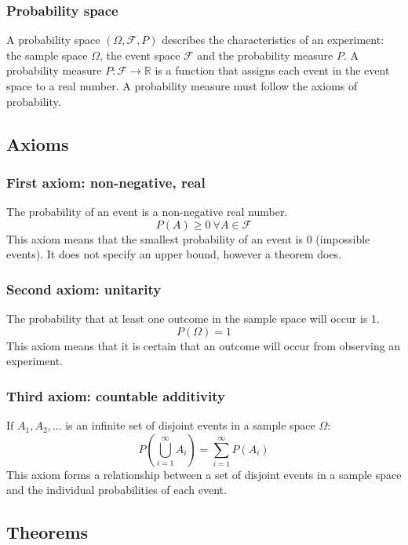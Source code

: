 \documentclass{article}
\begin{document}
\subsubsection{Probability space}

A probability space $(\Omega, \mathcal{F}, P)$ describes the characteristics of an experiment: the sample space $\Omega$, the event space $\mathcal{F}$ and the probability measure $P$. A probability measure $P:\mathcal{F}\rightarrow \mathbb{R}$ is a function that assigns each event in the event space to a real number. A probability measure must follow the axioms of probability.

\subsection{Axioms}

\subsubsection{First axiom: non-negative, real}

The probability of an event is a non-negative real number.
\[P(A) \geq 0 \ \forall A \in \mathcal{F}\]
This axiom means that the smallest probability of an event is 0 (impossible events). It does not specify an upper bound, however a theorem does.

\subsubsection{Second axiom: unitarity}

The probability that at least one outcome in the sample space will occur is 1.
\[P(\Omega)=1\]
This axiom means that it is certain that an outcome will occur from observing an experiment.

\subsubsection{Third axiom: countable additivity}

If $A_1, A_2, ...$ is an infinite set of disjoint events in a sample space $\Omega$:
\[P(\bigcup_{i=1}^\infty A_i) = \sum_{i=1}^\infty P(A_i)\]
This axiom forms a relationship between a set of disjoint events in a sample space and the individual probabilities of each event.

\subsection{Theorems}
\end{document}
